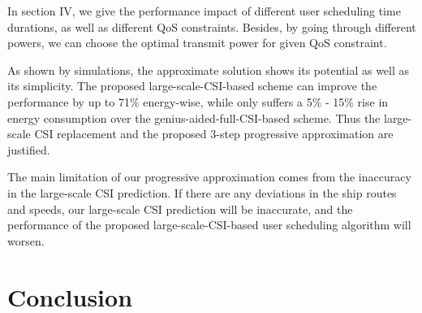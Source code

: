 \documentclass[conference]{IEEEtran}
\begin{document}
 

 In section IV, we give the performance impact of different user scheduling time durations, as well as different QoS constraints. 
 Besides, by going through different powers, we can choose the optimal transmit power for given QoS constraint. 
 
 
 As shown by simulations, the approximate solution shows its potential as well as its simplicity. The proposed large-scale-CSI-based scheme can improve the performance by up to 71\% energy-wise, while only suffers a 5\% - 15\% rise in energy consumption over the genius-aided-full-CSI-based scheme. Thus the large-scale CSI replacement and the proposed 3-step progressive approximation are justified. 

 The main limitation of our progressive approximation comes from the inaccuracy in the large-scale CSI prediction. %
 If there are any deviations in the ship routes and speeds, our large-scale CSI prediction will be inaccurate, and the performance of the proposed large-scale-CSI-based user scheduling algorithm will worsen. 
 
 \section{Conclusion}\label{sec:5}
 
\end{document}
